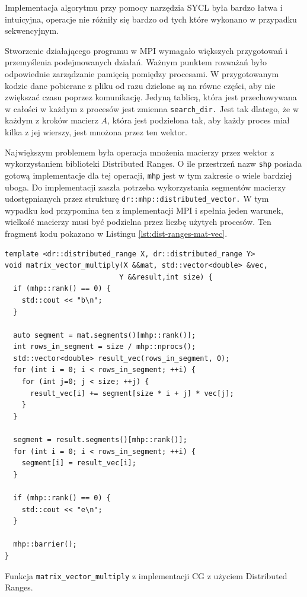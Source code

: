 \documentclass[a4paper,12pt]{book} %
\begin{document}
Implementacja algorytmu przy pomocy narzędzia SYCL była bardzo łatwa i intuicyjna, operacje nie różniły się bardzo od tych które wykonano w przypadku sekwencyjnym. 

Stworzenie działającego programu w MPI wymagało większych przygotowań i przemyślenia podejmowanych działań. Ważnym punktem rozważań było odpowiednie zarządzanie pamięcią pomiędzy procesami. W przygotowanym kodzie dane pobierane z pliku od razu dzielone są na równe części, aby nie zwiększać czasu poprzez komunikację. Jedyną tablicą, która jest przechowywana w całości w każdym z procesów jest zmienna \texttt{search\_dir.} Jest tak dlatego, że w każdym z kroków macierz $A$, która jest podzielona tak, aby każdy proces miał kilka z jej wierszy, jest mnożona przez ten wektor.

Największym problemem była operacja mnożenia macierzy przez wektor z wykorzystaniem biblioteki Distributed Ranges. O ile przestrzeń nazw \texttt{shp} posiada gotową implementacje dla tej operacji, \texttt{mhp} jest w tym zakresie o wiele bardziej uboga. Do implementacji zaszła potrzeba wykorzystania segmentów macierzy udostępnianych przez strukturę \texttt{dr::mhp::distributed\_vector.} W tym wypadku kod przypomina ten z implementacji MPI i spełnia jeden warunek, wielkość macierzy musi być podzielna przez liczbę użytych procesów. Ten fragment kodu pokazano w Listingu \ref{lst:dist-ranges-mat-vec}.

\begin{lstfloat}
\lstset{language=C++}
\begin{lstlisting}[frame=single]
template <dr::distributed_range X, dr::distributed_range Y>
void matrix_vector_multiply(X &&mat, std::vector<double> &vec, 
						   Y &&result,int size) {
  if (mhp::rank() == 0) {
    std::cout << "b\n";
  }

  auto segment = mat.segments()[mhp::rank()];
  int rows_in_segment = size / mhp::nprocs();
  std::vector<double> result_vec(rows_in_segment, 0);
  for (int i = 0; i < rows_in_segment; ++i) {
    for (int j=0; j < size; ++j) {
      result_vec[i] += segment[size * i + j] * vec[j];
    }
  }

  segment = result.segments()[mhp::rank()];
  for (int i = 0; i < rows_in_segment; ++i) {
    segment[i] = result_vec[i];
  }

  if (mhp::rank() == 0) {
    std::cout << "e\n";
  }

  mhp::barrier();
}

\end{lstlisting}
\caption{Funkcja \texttt{matrix\_vector\_multiply} z implementacji CG z użyciem Distributed Ranges.}
\label{lst:dist-ranges-mat-vec}
\end{lstfloat}
\end{document}
